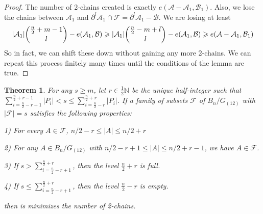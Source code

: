 \documentclass[12pt]{article}
\theoremstyle{plain}
\newtheorem{theorem}{Theorem}
\theoremstyle{definition}
\theoremstyle{remark}
\newcommand{\F}{\mathcal{F}}
\newcommand{\A}{\mathcal{A}}
\newcommand{\B}{\mathcal{B}}
\begin{document}
\begin{proof}
The number of 2-chains created is exactly $e(\A - \A_1, \B_1)$. Also, we lose the chains between $\A_1$ and $\partial^l\A_1 \cap \F = \partial^l\A_1 - \B$. We are losing at least
\[ |\A_1|\dbinom{\frac{n}{2}+m-1}{l} - e(\A_1, \B) \geq |\A_1|\dbinom{\frac{n}{2} - m + l}{l} - e(\A_1, \B) \geq e(\A - \A_1, \B_1) \] 
So in fact, we can shift these down without gaining any more 2-chains. We can repeat this process finitely many times until the conditions of the lemma are true.
\end{proof}


\begin{theorem} For any $s \geq m$, let $r \in \frac{1}{2}\mathbb{N}$ be the unique half-integer such that $\sum_{i = \frac{n}{2} - r +1}^{\frac{n}{2} + r -1} |P_i| < s \leq \sum_{i = \frac{n}{2}-r}^{\frac{n}{2}+r}|P_i|$. If a family of subsets $\F$ of $B_n / G_{(12)}$ with $|\F| = s$ satisfies the following properties:

1) For every $A \in \F$, $n/2 - r \leq |A| \leq n/2 + r$

2) For any $A \in B_n / G_{(12)}$ with $n/2 - r + 1 \leq |A| \leq n/2 + r - 1$, we have $A \in \F$.

3) If $s > \sum_{i=\frac{n}{2}-r+1}^{\frac{n}{2}+r}$, then the level $\frac{n}{2}+r$ is full.

4) If $s \leq \sum_{i=\frac{n}{2}-r+1}^{\frac{n}{2}+r}$, then the level $\frac{n}{2}-r$ is empty.

then is minimizes the number of 2-chains.
\end{theorem}
\end{document}
